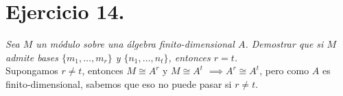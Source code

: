 \section{Ejercicio 14. } \textit{Sea \(M\) un módulo sobre una álgebra
  finito-dimensional \(A\). Demostrar que si \(M\) admite bases \(\{m_1, \dots,
  m_r\}\) y \(\{n_1,\dots,n_t\}\), entonces \(r = t\).}\\

Supongamos \(r \neq t\), entonces \(M \cong A^r\) y \(M \cong A^t\) \(\implies
A^r \cong A^t\), pero como \(A\) es finito-dimensional, sabemos que eso no puede
pasar si \(r \neq t\).
